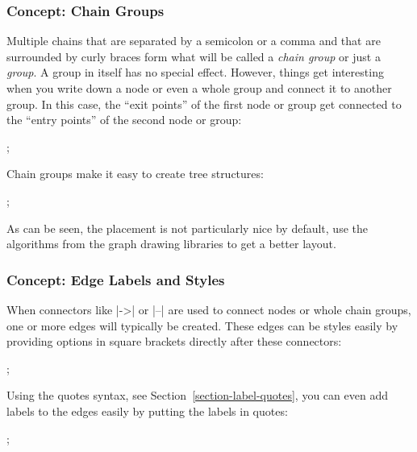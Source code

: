 \subsubsection{Concept: Chain Groups}

Multiple chains that are separated by a semicolon or a comma and that
are surrounded by curly braces form what will be called a \emph{chain
  group} or just a \emph{group}. A group in itself has no special
effect. However, things get interesting when you write down a node or
even a whole group and connect it to another group. In this case, the
``exit points'' of the first node or group get connected to the
``entry points'' of the second node or group:

\begin{codeexample}[]
\tikz {};  
\end{codeexample}

Chain groups make it easy to create tree structures:

\begin{codeexample}[]
\tikz {};
\end{codeexample}

As can be seen, the placement is not particularly nice by default, use
the algorithms from the graph drawing libraries to get a better layout.


\subsubsection{Concept: Edge Labels and Styles}

When connectors like |->| or |--| are used to connect nodes or whole
chain groups, one or more edges will typically be created. These edges
can be styles easily by providing options in square brackets directly
after these connectors:

\begin{codeexample}[]
\tikz {};
\end{codeexample}

Using the quotes syntax, see Section~\ref{section-label-quotes},
you can even add labels to the edges easily by putting the labels in
quotes: 

\begin{codeexample}[]
\tikz {};
\end{codeexample}

